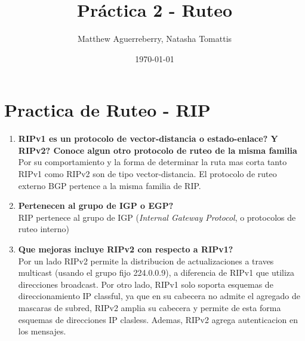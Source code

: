 \documentclass[letterpaper,12pt]{article}
\begin{document}
\title{Práctica 2 - Ruteo}
\author{Matthew Aguerreberry, Natasha Tomattis}
\date{\today}
\maketitle



\section{Practica de Ruteo - RIP}
	\begin{enumerate}
		\item \textbf{RIPv1 es un protocolo de vector-distancia o estado-enlace? Y RIPv2? Conoce algun otro protocolo de ruteo de la misma familia} \\
		Por su comportamiento y la forma de determinar la ruta mas corta tanto RIPv1 como RIPv2 son de tipo vector-distancia. El protocolo de ruteo externo BGP pertence a la misma familia de RIP.
		\item \textbf{Pertenecen al grupo de IGP o EGP?}\\
		RIP pertenece al grupo de IGP (\textit{Internal Gateway Protocol}, o protocolos de ruteo interno)
		\item \textbf{Que mejoras incluye RIPv2 con respecto a RIPv1?}\\
		Por un lado RIPv2 permite la distribucion de actualizaciones a traves multicast (usando el grupo fijo 224.0.0.9), a diferencia de RIPv1 que utiliza direcciones broadcast. Por otro lado, RIPv1 solo soporta esquemas de direccionamiento IP classful, ya que en su cabecera no admite el agregado de mascaras de subred, RIPv2 amplia su cabecera y permite de esta forma esquemas de direcciones IP clasless. Ademas, RIPv2 agrega autenticacion en los mensajes.

	\end{enumerate}
\end{document}
